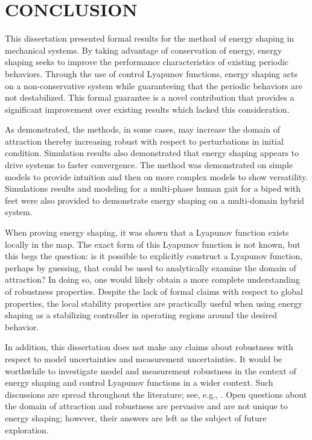 \chapter{\uppercase{Conclusion}}

This dissertation presented formal results for the method of energy shaping in
mechanical systems.
%
By taking advantage of conservation of energy, energy shaping seeks to improve
the performance characteristics of existing periodic behaviors.
%
Through the use of control Lyapunov functions, energy shaping acts on a
non-conservative system while guaranteeing that the periodic behaviors are not
destabilized.
%
This formal guarantee is a novel contribution that provides a significant
improvement over existing results which lacked this consideration.


As demonstrated, the methods, in some cases, may increase the domain of
attraction thereby increasing robust with respect to perturbations in initial
condition.
%
Simulation results also demonstrated that energy shaping appears to drive
systems to faster convergence.
%
The method was demonstrated on simple models to provide intuition and then on
more complex models to show versatility.
%
Simulations results and modeling for a multi-phase human gait for a biped with
feet were also provided to demonstrate energy shaping on a multi-domain hybrid
system.


When proving energy shaping, it was shown that a Lyapunov function exists
locally in the \Poincare{} map.
%
The exact form of this Lyapunov function is not known, but this begs the
question:
%
is it possible to explicitly construct a Lyapunov function, perhaps by guessing,
that could be used to analytically examine the domain of attraction?
%
In doing so, one would likely obtain a more complete understanding of robustness
properties.
%
Despite the lack of formal claims with respect to global properties, the local
stability properties are practically useful when using energy shaping as a
stabilizing controller in operating regions around the desired behavior.


In addition, this dissertation does not make any claims about robustness with
respect to model uncertainties and measurement uncertainties.
%
It would be worthwhile to investigate model and measurement robustness in the
context of energy shaping and control Lyapunov functions in a wider context.
%
Such discussions are spread throughout the literature; see, e.g.,
\cite{Freeman1996}.
%
Open questions about the domain of attraction and robustness are pervasive and
are not unique to energy shaping;
%
however, their answers are left as the subject of future exploration.


